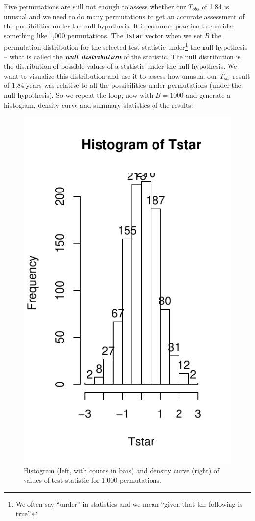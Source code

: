 \documentclass[]{book}
\let\rmarkdownfootnote\footnote%
\def\footnote{\protect\rmarkdownfootnote}
\theoremstyle{definition}
\theoremstyle{definition}
\theoremstyle{remark}
\begin{document}
Five permutations are still not enough to assess whether our \(T_{obs}\)
of 1.84 is unusual and we need to do many permutations to get an
accurate assessment of the possibilities under the null hypothesis. It
is common practice to consider something like 1,000 permutations. The
\texttt{Tstar} vector when we set \emph{B} the permutation distribution
for the selected test statistic under\footnote{We often say ``under'' in
  statistics and we mean ``given that the following is true''.} the null
hypothesis -- what is called the \textbf{\emph{null distribution}} of
the statistic. The null distribution is the distribution of possible
values of a statistic under the null hypothesis. We want to visualize
this distribution and use it to assess how unusual our \(T_{obs}\)
result of 1.84 years was relative to all the possibilities under
permutations (under the null hypothesis). So we repeat the loop, now
with \(B=1000\) and generate a histogram, density curve and summary
statistics of the results:




\begin{figure}
\centering
\includegraphics{02-reintroductionToStatistics_files/figure-latex/Figure2-9-1.pdf}
\caption{\label{fig:Figure2-9}Histogram (left, with counts in bars) and density curve
(right) of values of test statistic for 1,000 permutations.}
\end{figure}
\end{document}
